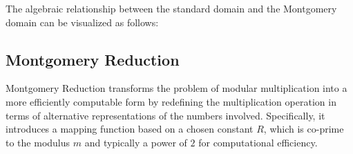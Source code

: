 The algebraic relationship between the standard domain and the Montgomery domain can be visualized as follows:

\begin{center}
\end{center}

\newpage
\subsection{Montgomery Reduction}
Montgomery Reduction transforms the problem of modular multiplication into a more efficiently computable form by redefining the multiplication operation in terms of alternative representations of the numbers involved. Specifically, it introduces a mapping function based on a chosen constant $R$, which is co-prime to the modulus $m$ and typically a power of $2$ for computational efficiency.
\vspace{8pt}
